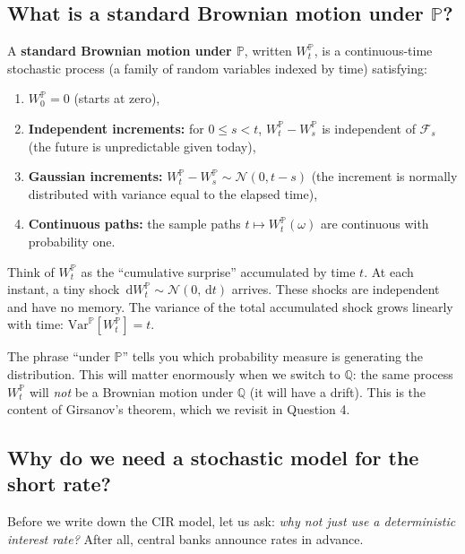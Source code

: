 \documentclass[11pt]{article}
\newcommand{\PP}{\mathbb{P}}
\newcommand{\QQ}{\mathbb{Q}}
\newcommand{\FF}{\mathcal{F}}
\newcommand{\NN}{\mathcal{N}}
\newcommand{\dd}{\,\mathrm{d}}
\begin{document}
\subsection{What is a standard Brownian motion under $\PP$?}

A \textbf{standard Brownian motion under $\PP$}, written $W_t^\PP$, is a
continuous-time stochastic process (a family of random variables indexed
by time) satisfying:
\begin{enumerate}
  \item $W_0^\PP = 0$ (starts at zero),
  \item \textbf{Independent increments:} for $0\le s< t$, $W_t^\PP - W_s^\PP$ is
  independent of $\FF_s$ (the future is unpredictable given today),
  \item \textbf{Gaussian increments:} $W_t^\PP - W_s^\PP \sim \NN(0, t-s)$
  (the increment is normally distributed with variance equal to the
  elapsed time),
  \item \textbf{Continuous paths:} the sample paths $t\mapsto W_t^\PP(\omega)$
  are continuous with probability one.
\end{enumerate}

\begin{intuition}
Think of $W_t^\PP$ as the ``cumulative surprise'' accumulated by time $t$.
At each instant, a tiny shock $\dd W_t^\PP \sim \NN(0,\dd t)$ arrives.
These shocks are independent and have no memory.  The variance of the total
accumulated shock grows linearly with time: $\mathrm{Var}^\PP[W_t^\PP]=t$.

The phrase ``under $\PP$'' tells you which probability measure is
generating the distribution.  This will matter enormously when we switch
to $\QQ$: the same process $W_t^\PP$ will \emph{not} be a Brownian motion
under $\QQ$ (it will have a drift).  This is the content of Girsanov's
theorem, which we revisit in Question 4.
\end{intuition}

\subsection{Why do we need a stochastic model for the short rate?}

Before we write down the CIR model, let us ask: \emph{why not just use a
deterministic interest rate?}  After all, central banks announce rates in
advance.
\end{document}
